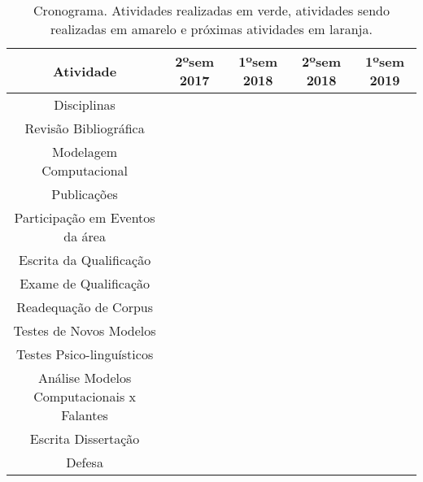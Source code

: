 \begin{table}[ht!]
  \center
  \begin{tabular}{|c|c|c|c|c|}\hline
    {Atividade} & 2ºsem 2017 & 1ºsem 2018 & 2ºsem 2018 & 1ºsem 2019 \\ \hline \hline
    Disciplinas & \cellcolor{green!45} &\cellcolor{green!45} &  & \\ \hline
    Revisão Bibliográfica & \cellcolor{green!45} & \cellcolor{green!45} & \cellcolor{yellow!45} & \\ \hline 
    Modelagem Computacional & \cellcolor{green!45} & \cellcolor{green!45} & \cellcolor{yellow!45}& \\ \hline
    Publicações & & & \cellcolor{green!45} & \\ \hline
   Participação em Eventos da área &\cellcolor{green!45} & \cellcolor{green!45} & \cellcolor{yellow!45} & \cellcolor{orange!45}\\ \hline
    Escrita da Qualificação & &\cellcolor{green!45} &\cellcolor{green!45} &  \\ \hline
    Exame de Qualificação & & &\cellcolor{yellow!45} & \\ \hline
    Readequação de Corpus & & &\cellcolor{orange!45} &  \\ \hline
    Testes de Novos Modelos & & &\cellcolor{orange!45} &\\ \hline
    Testes Psico-linguísticos & & & &\cellcolor{orange!45} \\ \hline
    Análise Modelos Computacionais x Falantes & & & &\cellcolor{orange!45} \\ \hline
    Escrita Dissertação & & &\cellcolor{yellow!45} &\cellcolor{orange!45}\\ \hline
    Defesa & & & &\cellcolor{orange!45} \\ \hline
  \end{tabular}
  \caption{Cronograma. Atividades realizadas em verde, atividades sendo realizadas em amarelo e próximas atividades em laranja.}
  \label{tab:schedule}
\end{table}